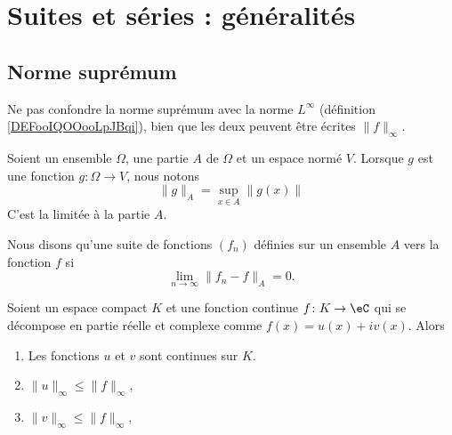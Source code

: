 
\section{Suites et séries : généralités}
\label{SECooTDZNooJvjPks}

\subsection{Norme suprémum}

Ne pas confondre la norme suprémum avec la norme \( L^{\infty}\) (définition \ref{DEFooIQOOooLpJBqi}), bien que les deux peuvent être écrites \( \| f \|_{\infty}\).

\begin{definition}		\label{DEFooSFNFooBygeXX}
	Soient un ensemble \( \Omega\), une partie \( A\) de \( \Omega\) et un espace normé \( V\). Lorsque \( g\) est une fonction \( g\colon \Omega\to V\), nous notons
	\begin{equation}
		\| g \|_A=\sup_{x\in A}\| g(x) \|
	\end{equation}
	C'est la  limitée à la partie \( A\).

	Nous disons qu'une suite de fonctions \( (f_n)\) définies sur un ensemble \( A\)  vers la fonction \( f\) si
	\begin{equation}
		\lim_{n\to \infty} \| f_n-f \|_A=0.
	\end{equation}
\end{definition}

\begin{lemma}       \label{LEMooLPRZooUPsWTR}
	Soient un espace compact \( K\) et une fonction continue \( f\colon K\to \eC\) qui se décompose en partie réelle et complexe comme \( f(x)=u(x)+iv(x)\). Alors
	\begin{enumerate}
		\item
		      Les fonctions \( u\) et \( v\) sont continues sur \( K\).
		\item
		      \( \| u \|_{\infty}\leq \| f \|_{\infty}\),
		\item
		      \( \| v \|_{\infty}\leq \| f \|_{\infty}\),
	\end{enumerate}
\end{lemma}

